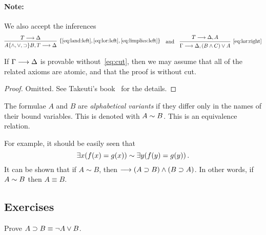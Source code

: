 \documentclass[11pt,a4paper]{article}
\begin{document}
\paragraph{Note:}
We also accept the inferences
\begin{equation*}
    \begin{prooftree}
        \hypo{T\seq \Delta}
        \infer1[\(\set{\eqref{eq:land:left},\eqref{eq:lor:left},\eqref{eq:limplies:left}}\)]{A\set{\land,\lor,\limplies } B, T\seq \Delta}
    \end{prooftree}
    \quad\text{and}\quad
    \begin{prooftree}
        \hypo{T\seq \Delta, A}
        \infer1[\eqref{eq:lor:right}]{\Gamma\seq\Delta, \arcs{B\land C}\lor A}
    \end{prooftree}
\end{equation*}

\begin{proposition}\label{prop:if provable, then atomic}
    If \(\Gamma\longrightarrow\Delta\) is provable without~\eqref{eq:cut},
    then we may assume that all of the related axioms are atomic,
    and that the proof is without cut.
\end{proposition}

\begin{proof}
    Omitted. See Takeuti's book~\cite[14-17]{Takeuti-1987} for the details.
\end{proof}

\begin{definition}\label{def:alphabetical variants}
    The formulae \(A\) and \(B\) are \emph{alphabetical variants}
    if they differ only in the names of their bound variables.
    This is denoted with \(A\sim{B}\). This is an equivalence relation.
\end{definition}

For example, it should be easily seen that
\begin{equation*}
    \exists x(f(x) = g(x)) \sim\exists y(f(y) = g(y))\,.
\end{equation*}
It can be shown that if \(A\sim B\), then \(\longrightarrow(A\supset B)\land(B\supset A)\).
In other words, if \(A\sim B\) then \(A\equiv B\).



\subsection{Exercises}

\begin{exercise}[Exercise 2.5.2]\label{exe:2.5.2}
    Prove \(A\supset B \equiv \lnot A\lor B\).
\end{exercise}
\end{document}
